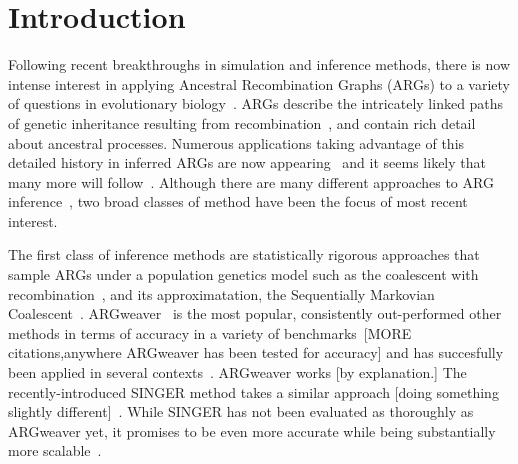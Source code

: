 \documentclass{article}
\begin{document}
\section{Introduction}
Following recent breakthroughs in simulation and inference methods,
there is now intense interest in applying Ancestral Recombination Graphs (ARGs)
to a variety of questions in evolutionary
biology~\citep{lewanski_era_2024,brandt_promise_2024}.
ARGs describe the intricately linked paths
of genetic inheritance resulting from
recombination~\citep{hudson_properties_1983,griffiths_ancestral_1996,wong_general_2023},
and contain rich detail about ancestral processes.
Numerous applications taking advantage of this detailed history
in inferred ARGs are now appearing~\citep{
stern_approximate_2019,
osmond_estimating_2021,
fan_genealogical_2022,
hejase_deep_2022,
guo_recombination-aware_2022,
ignatieva_ongoing_2022,
wang_complex_2022,
zhang_biobank-scale_2023,
nowbandegani_extremely_2023,
ignatieva_distribution_2023,
fan_likelihood_2023,
huang_estimating_2024,
grundler_geographic_2024,
korfmann_simultaneous_2024,
deraje_inferring_2024}
and it seems likely that many more will
follow~\citep{harris_database_2019,harris_using_2023}.
Although there are many different approaches to ARG
inference~\citep{wong_general_2023}, two broad classes of method
have been the focus of most recent interest.

The first class of inference methods are statistically rigorous approaches
that sample ARGs under a population genetics model such as the
coalescent with recombination~\citep{hudson_properties_1983},
and its approximatation, the Sequentially Markovian
Coalescent~\citep{mcvean_approximating_2005,marjoram_fast_2006}.
ARGweaver~\citep{rasmussen_genome-wide_2014} is the most popular,
consistently out-performed other methods in terms 
of accuracy in a variety of benchmarks~\citep{brandt2022evaluation}[MORE
citations,anywhere ARGweaver has been tested for accuracy]
and has succesfully been applied in several
contexts~\citep[e.g.][]{de_chimpanzee_2016,shriner_whole_2018,hejase_genomic_2020,
stankowski_genetic_2024}. 
ARGweaver works [by explanation.]
The recently-introduced SINGER method takes a similar approach [doing something 
slightly different]~\citep{deng_robust_2024}.
While SINGER has not been evaluated as thoroughly as ARGweaver yet, it promises
to be even more accurate while being substantially more
scalable~\citep{deng_robust_2024}. 
\end{document}

